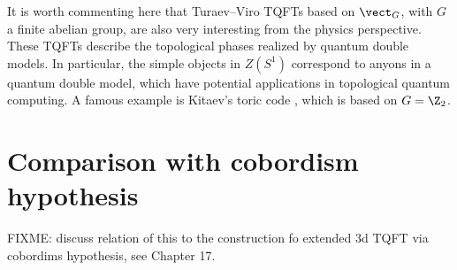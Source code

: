 It is worth commenting here that Turaev--Viro TQFTs based on $\vect_G$, with $G$ a finite abelian group,
 are also very interesting from the physics perspective. These TQFTs describe the topological phases realized 
 by quantum double models. In particular, the simple objects in $Z(S^1)$ correspond to anyons in a 
 quantum double model, which have potential applications in topological quantum computing. A famous example
  is Kitaev's toric code \cite{kitaev}, which is based on $G=\Z_2$.


\section{Comparison with cobordism hypothesis}\label{auto:c19-TV-comparison-with-cobordism-hypothesis}
FIXME: discuss relation of this to the construction fo extended 3d TQFT via cobordims hypothesis, see Chapter 17. 
